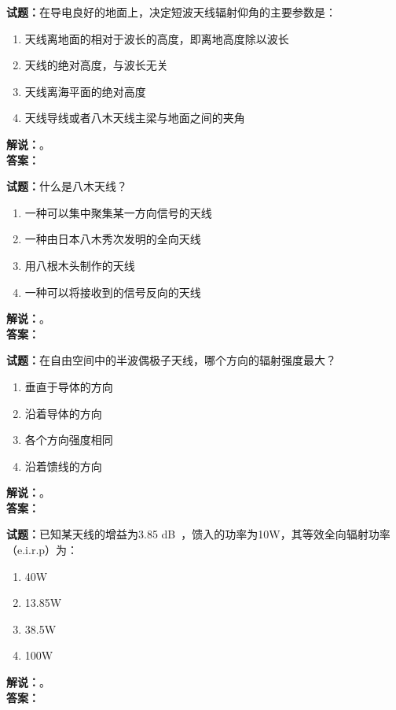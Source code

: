 \documentclass{ctexbook}
\begin{document}
\noindent\textbf{试题：}在导电良好的地面上，决定短波天线辐射仰角的主要参数是：
\begin{enumerate}[leftmargin=3em]
  \item 天线离地面的相对于波长的高度，即离地高度除以波长
  \item 天线的绝对高度，与波长无关
  \item 天线离海平面的绝对高度
  \item 天线导线或者八木天线主梁与地面之间的夹角
\end{enumerate}
\noindent\textbf{解说：}\textbf{}。\\\noindent\textbf{答案：}

\vspace{\baselineskip}

\noindent\textbf{试题：}什么是八木天线？
\begin{enumerate}[leftmargin=3em]
  \item 一种可以集中聚集某一方向信号的天线
  \item 一种由日本八木秀次发明的全向天线
  \item 用八根木头制作的天线
  \item 一种可以将接收到的信号反向的天线
\end{enumerate}
\noindent\textbf{解说：}\textbf{}。\\\noindent\textbf{答案：}

\vspace{\baselineskip}

\noindent\textbf{试题：}在自由空间中的半波偶极子天线，哪个方向的辐射强度最大？
\begin{enumerate}[leftmargin=3em]
  \item 垂直于导体的方向
  \item 沿着导体的方向
  \item 各个方向强度相同
  \item 沿着馈线的方向
\end{enumerate}
\noindent\textbf{解说：}\textbf{}。\\\noindent\textbf{答案：}

\vspace{\baselineskip}

\noindent\textbf{试题：}已知某天线的增益为3.85 \unit[qualifier-mode=combine]{\deci\bel{}}，馈入的功率为10W，其等效全向辐射功率（e.i.r.p）为：
\begin{enumerate}[leftmargin=3em]
  \item 40W
  \item 13.85W
  \item 38.5W
  \item 100W
\end{enumerate}
\noindent\textbf{解说：}\textbf{}。\\\noindent\textbf{答案：}
\end{document}
